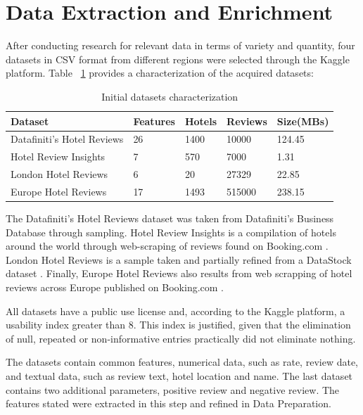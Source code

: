 \documentclass[sigconf]{acmart}
\begin{document}
\section{Data Extraction and Enrichment}

After conducting research for relevant data in terms of variety and quantity, four datasets in CSV format from different regions were selected through the Kaggle \cite{kaggle} platform. Table ~\ref{tab:initFreq} provides a characterization of the acquired datasets:

\begin{table}[h]
\small
\caption{Initial datasets characterization}
\label{tab:initFreq}
\begin{tabular}{lllll}
\toprule
Dataset & Features & Hotels & Reviews & Size(MBs)\\
\midrule
Datafiniti's Hotel Reviews & 26 & 1400 & 10000 & 124.45 \\
Hotel Review Insights & 7 & 570 & 7000 & 1.31 \\
London Hotel Reviews & 6 & 20 & 27329 & 22.85 \\
Europe Hotel Reviews & 17 & 1493 & 515000 & 238.15 \\
\bottomrule
\end{tabular}
\end{table}


The Datafiniti's Hotel Reviews \cite{Datafiniti's_Hotel_Reviews} dataset was taken from Datafiniti's Business Database \cite{Datafiniti's_Business_Database} through sampling. Hotel Review Insights \cite{Hotel_Review_Insights} is a compilation of hotels around the world through web-scraping of reviews found on Booking.com \cite{Booking}. London Hotel Reviews \cite{London_Hotel_Reviews} is a sample taken and partially refined from a DataStock dataset \cite{DataStock}. Finally, Europe Hotel Reviews \cite{Europe_Hotel_Reviews} also results from web scrapping of hotel reviews across Europe published on Booking.com \cite{Booking}.

All datasets have a public use license and, according to the Kaggle platform, a usability index greater than 8. This index is justified, given that the elimination of null, repeated or non-informative entries practically did not eliminate nothing.

The datasets contain common features, numerical data, such as rate, review date, and textual data, such as review text, hotel location and name. The last dataset contains two additional parameters, positive review and negative review. The features stated were extracted in this step and refined in Data Preparation.
\end{document}
